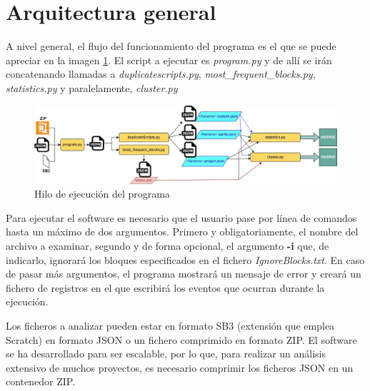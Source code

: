 \documentclass[a4paper, 12pt]{book}
\begin{document}
\section{Arquitectura general} 
\label{sec:arquitectura}



A nivel general, el flujo del funcionamiento del programa es el que se puede apreciar en la imagen \ref{fig:fasedesejecucion}. El script a ejecutar es \textit{program.py} y de allí se irán concatenando llamadas a \textit{duplicatescripts.py}, \textit{most\_frequent\_blocks.py}, \textit{statistics.py} y paralelamente, \textit{cluster.py}

\begin{figure}[!htb]
  \centering
  \includegraphics[width=17cm, keepaspectratio]{img/flow.jpg}
  \caption{Hilo de ejecución del programa}
  \label{fig:fasedesejecucion}
\end{figure}

Para ejecutar el software es necesario que el usuario pase por línea de comandos hasta un máximo de dos argumentos. Primero y obligatoriamente, el nombre del archivo a examinar, segundo y de forma opcional, el argumento \textbf{-i} que, de indicarlo, ignorará los bloques especificados en el fichero \textit{IgnoreBlocks.txt}. En caso de pasar más argumentos, el programa mostrará un mensaje de error y creará un fichero de registros en el que escribirá los eventos que ocurran durante la ejecución.

Los ficheros a analizar pueden estar en formato SB3 (extensión que emplea Scratch) en formato JSON o un fichero comprimido en formato ZIP. El software se ha desarrollado para ser escalable, por lo que, para realizar un análisis extensivo de muchos proyectos, es necesario comprimir los ficheros JSON en un contenedor ZIP. 
\end{document}

